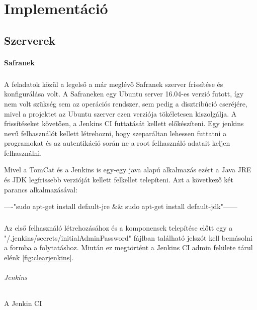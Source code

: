\chapter{Implementáció}
\label{chapImplemetacio}

\section{Szerverek}

\subsubsection{Safranek}

\paragraph{}
A feladatok közül a legelső a már meglévő Safranek szerver frissítése és konfigurálása volt. 
A Safraneken egy Ubuntu server 16.04-es verzió futott, így nem volt szükség sem az operációs rendszer, sem pedig a disztribúció cseréjére, mivel a projektet az Ubuntu szerver ezen verziója tökéletesen kiszolgálja.
A frissítéseket követően, a Jenkins CI futtatását kellett előkészíteni. 
Egy jenkins nevű felhasználót kellett létrehozni, hogy szeparáltan lehessen futtatni a programokat és az autentikáció során ne a root felhasználó adatait keljen felhasználni. 

Mivel a TomCat és a Jenkins is egy-egy java alapú alkalmazás ezért a Java JRE és JDK legfrissebb verzióját kellett felkellet telepíteni. 
Azt a következő két parancs alkalmazásával: 

----"sudo apt-get install default-jre \&\& sudo apt-get install default-jdk"------


\paragraph{}
Az első felhasználó létrehozásához és a komponensek telepítése előtt egy a "/.jenkins/secrets/initialAdminPassword" fájlban található jelszót kell bemásolni a formba a folytatáshoz. 
Miután ez megtörtént a Jenkins CI admin felülete tárul elénk \ref{fig:clearjenkins}. 

\subparagraph{Jenkins}

A Jenkin CI 